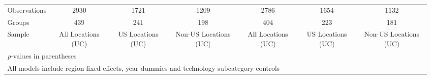 \begin{table}[htbp]
\begin{tabular}{l*{6}{c}}
\hline
Observations    &     2930&     1721&     1209&     2786&     1654&     1132\\
Groups          &      439&      241&      198&      404&      223&      181\\
Sample          &All Locations (UC)&US Locations (UC)&Non-US Locations (UC)&All Locations (UC)&US Locations (UC)&Non-US Locations (UC)\\
\hline\hline
\multicolumn{7}{l}{\footnotesize \textit{p}-values in parentheses}\\
\multicolumn{7}{l}{\footnotesize All models include region fixed effects, year dummies and technology subcategory controls}\\
\end{tabular}
\end{table}
